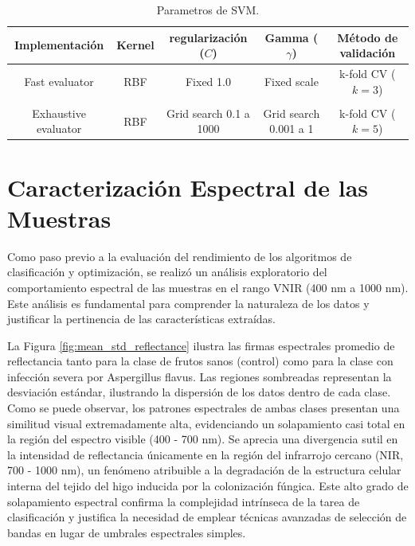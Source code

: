 \begin{table}[H] 
\caption{Parametros de SVM.\label{tab:svm_params}}
\begin{tabularx}{\textwidth}{CCCCC}
\toprule
\textbf{Implementación} & \textbf{Kernel} & \textbf{regularización ($C$)} & \textbf{Gamma ($\gamma$)} & \textbf{Método de validación}\\
\midrule
Fast evaluator       & RBF & Fixed 1.0             & Fixed scale & k-fold CV ($k=3$)\\ \\
Exhaustive evaluator & RBF & Grid search 0.1 a 1000 & Grid search 0.001 a 1 & k-fold CV ($k=5$)\\
\bottomrule
\end{tabularx}
\noindent
\end{table}

\section{Caracterización Espectral de las Muestras}
Como paso previo a la evaluación del rendimiento de los algoritmos de clasificación y optimización, se realizó un análisis exploratorio del comportamiento espectral de las muestras en el rango VNIR (400 nm a 1000 nm). Este análisis es fundamental para comprender la naturaleza de los datos y justificar la pertinencia de las características extraídas.

La Figura \ref{fig:mean_std_reflectance} ilustra las firmas espectrales promedio de reflectancia tanto para la clase de frutos sanos (control) como para la clase con infección severa por Aspergillus flavus. Las regiones sombreadas representan la desviación estándar, ilustrando la dispersión de los datos dentro de cada clase. Como se puede observar, los patrones espectrales de ambas clases presentan una similitud visual extremadamente alta, evidenciando un solapamiento casi total en la región del espectro visible (400 - 700 nm). Se aprecia una divergencia sutil en la intensidad de reflectancia únicamente en la región del infrarrojo cercano (NIR, 700 - 1000 nm), un fenómeno atribuible a la degradación de la estructura celular interna del tejido del higo inducida por la colonización fúngica. Este alto grado de solapamiento espectral confirma la complejidad intrínseca de la tarea de clasificación y justifica la necesidad de emplear técnicas avanzadas de selección de bandas en lugar de umbrales espectrales simples.

